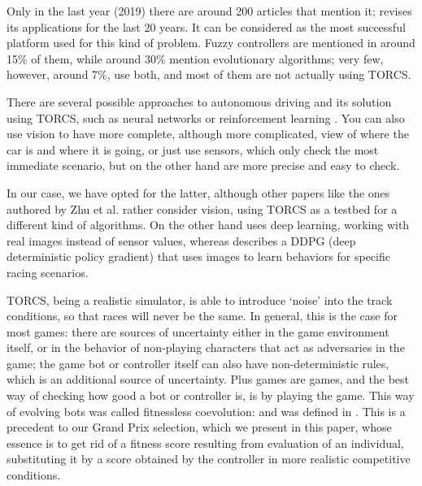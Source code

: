 \documentclass[10pt,journal,compsoc]{IEEEtran}
\begin{document}
Only in the last year (2019) there are around 200 articles that
mention it; \cite{schiavullo2019torcs} revises its applications for the last 20 years. It can be considered as the most successful platform used for this kind of problem. 
Fuzzy controllers are mentioned in around 15\% of them, while around 30\% mention evolutionary algorithms; very few, however, around 7\%, use both, and most of them are not actually using TORCS.

There are several possible approaches to autonomous driving and its
solution using TORCS, such as neural networks or reinforcement learning \cite{abuzekry2comparative}. 
You can also use vision to have more complete, although more complicated, view of where the car is and where it is going, or just use sensors, which only check the most immediate scenario, but on the other hand are more precise and easy to check. 

In our case, we have opted for the latter, although other papers like the
ones authored by Zhu et al. \cite{zhu2018driving,zhu2019vision,neurone} rather
consider vision, using TORCS as a testbed for a different kind of
algorithms. On the other hand \cite{8833873} uses deep learning, working with real images instead of sensor values, whereas \cite{Kaushik_2018_ECCV_Workshops} describes a DDPG (deep deterministic policy gradient) that uses images to learn behaviors for specific racing scenarios.

TORCS, being a realistic simulator, is able to introduce `noise' into
the track conditions, so that races will never be the same. In
general, this is the case for most games: there are sources of
uncertainty either in the game environment itself, or in the behavior
of non-playing characters that act as adversaries in the game; the
game bot or controller itself can also have non-deterministic rules,
which is an additional source of uncertainty. Plus games are games,
and the best way of checking how good a bot or controller is, is by
playing the game. This way of evolving bots was called fitnessless
coevolution: and was defined in
\cite{Jaskowski:2008:FC:1389095.1389161}. This is a precedent to our
Grand Prix selection, which we present in this paper, whose essence is
to get rid of a fitness score resulting from evaluation of an
individual, substituting it by a score obtained by the controller in
more realistic competitive conditions.
\end{document}
